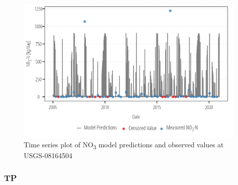 \documentclass[
]{article}
\begin{document}
\begin{figure}[h]

{\centering \includegraphics{model_assessment_files/figure-pdf/unnamed-chunk-43-1.png}

}

\caption{Time series plot of NO\textsubscript{3} model predictions and
observed values at USGS-08164504}

\end{figure}

\clearpage

\hypertarget{tp-3}{%
\subsubsection{TP}\label{tp-3}}
\end{document}
